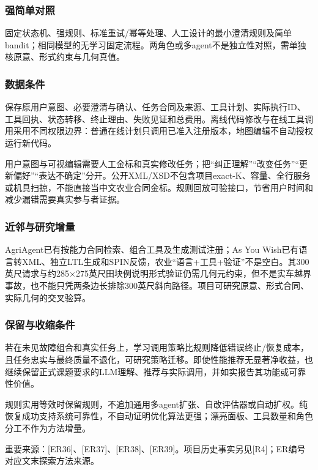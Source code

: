 \documentclass[11pt,a4paper]{article}
\newcommand{\bodytext}[1]{#1\par}
\newcommand{\sourcetext}[1]{{\fontsize{9.2}{14}\selectfont\color{Muted}#1\par}}
\begin{document}
\subsubsection{强简单对照}
\bodytext{固定状态机、强规则、标准重试/\allowbreak{}幂等处理、人工设计的最小澄清规则及简单bandit；相同模型的无学习固定流程。两角色或多agent不是独立性对照，需单独核原意、形式约束与几何真值。}
\subsubsection{数据条件}
\bodytext{保存原用户意图、必要澄清与确认、任务合同及来源、工具计划、实际执行ID、工具回执、状态转移、终止理由、失败见证和总费用。离线代码修改与在线工具调用采用不同权限边界：普通在线计划只调用已准入注册版本，地图编辑不自动授权运行新代码。}
\bodytext{用户意图与可视编辑需要人工金标和真实修改任务；把“纠正理解”“改变任务”“更新偏好”“表达不确定”分开。公开XML/\allowbreak{}XSD不包含项目exact-K、容量、全行服务或机具扫掠，不能直接当中文农业合同金标。规则回放可验接口，节省用户时间和减少漏错需要真实参与者证据。}
\subsubsection{近邻与研究增量}
\bodytext{AgriAgent已有按能力合同检索、组合工具及生成测试注册；As You Wish已有语言转XML、独立LTL生成和SPIN反馈，农业“语言+工具+验证”不是空白。其300英尺请求与约285×275英尺田块例说明形式验证仍需几何元约束，但不是实车越界事故，也不能只凭两条边长排除300英尺斜向路径。项目可研究原意、形式合同、实际几何的交叉验算。}
\subsubsection{保留与收缩条件}
\bodytext{若在未见故障组合和真实任务上，学习调用策略比规则降低错误终止/\allowbreak{}恢复成本，且任务忠实与最终质量不退化，可研究策略迁移。即使性能推荐无显著净收益，也继续保留正式课题要求的LLM理解、推荐与实际调用，并如实报告其功能或可靠性价值。}
\bodytext{规则实用等效时保留规则，不追加通用多agent扩张、自改评估器或自动扩权。纯恢复成功支持系统可靠性，不自动证明优化算法更强；漂亮面板、工具数量和角色分工不作为方法增量。}
\sourcetext{重要来源：[ER36]、[ER37]、[ER38]、[ER39]。项目历史事实另见[R4]；ER编号对应文末探索方法来源。}
\end{document}
